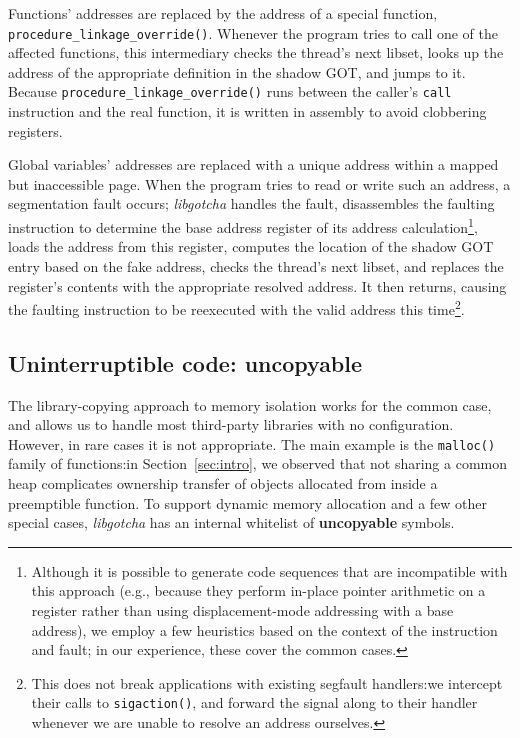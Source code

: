 Functions' addresses are replaced by the address of a special function,
\texttt{procedure\_linkage\_override()}.  Whenever the program tries to call one of
the affected functions, this intermediary checks the thread's next libset, looks up
the address of the appropriate definition in the shadow GOT, and jumps to it.
Because \texttt{procedure\_linkage\_override()} runs between the caller's
\texttt{call} instruction and the real function, it is written in assembly to avoid
clobbering registers.


Global variables' addresses are replaced with a unique address within a mapped but
inaccessible page.  When the program tries to read or write such an address, a
segmentation fault occurs; \textit{libgotcha} handles the fault, disassembles the
faulting instruction to determine the base address register of its address
calculation\footnote{Although it is possible to
generate code sequences that are incompatible with this approach (e.g., because they
perform in-place pointer arithmetic on a register rather than using displacement-mode
addressing with a base address), we employ a few heuristics based on the context of
the instruction and fault; in our experience, these cover the common cases.},
loads the address from this register, computes the location of the
shadow GOT entry based on the fake address, checks the thread's next libset, and
replaces the register's contents with the appropriate resolved address.  It then
returns, causing the faulting instruction to be reexecuted with the valid address
this time\footnote{This does not break applications with existing segfault
handlers:\@ we intercept their calls to \texttt{sigaction()}, and forward the signal
along to their handler whenever we are unable to resolve an address ourselves.}.



\subsection{Uninterruptible code: uncopyable}

The library-copying approach to memory isolation works for the common case, and
allows us to handle most third-party libraries with no configuration.  However, in
rare cases it is not appropriate.  The main example is the \texttt{malloc()} family
of functions:\@ in Section~\ref{sec:intro}, we observed that not sharing a common
heap complicates ownership transfer of objects allocated from inside a preemptible
function.  To support dynamic memory allocation and a few other special cases,
\textit{libgotcha} has an internal whitelist of \textbf{uncopyable} symbols.

